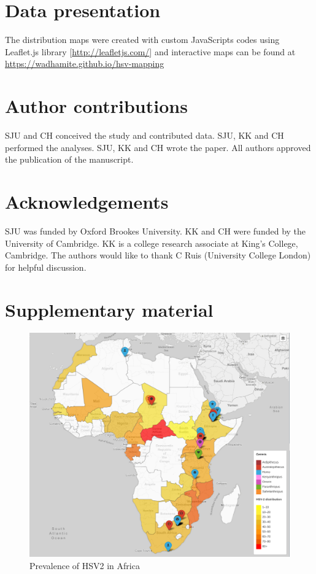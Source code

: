 \documentclass[fleqn,10pt]{wlscirep}
\begin{document}
\section*{Data presentation}
The distribution maps were created with custom JavaScripts codes using Leaflet.js library [\url{http://leafletjs.com/}] and interactive maps can be found at \url{https://wadhamite.github.io/hsv-mapping}

\section*{Author contributions}
SJU and CH conceived the study and contributed data. SJU, KK and CH performed the analyses. SJU, KK and CH wrote the paper. All authors approved the publication of the manuscript.

\section*{Acknowledgements}
SJU was funded by Oxford Brookes University. KK and CH were funded by the University of Cambridge. KK is a college research associate at King’s College, Cambridge. The authors would like to thank C Ruis (University College London) for helpful discussion. 



\clearpage
\section*{Supplementary material}
\renewcommand\thefigure{A.\arabic{figure}}    
\setcounter{figure}{0} 

\begin{figure}[!h]
	\centering
	\includegraphics[width=\textwidth]{figs/fossils}
	\caption{Prevalence of HSV2 in Africa}
	\label{fig:hsv2}   
\end{figure}  
\end{document}
